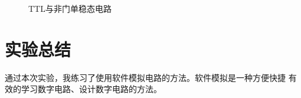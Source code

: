 \documentclass[a4paper,twoside]{ctexart}
\begin{document}
\begin{spacing}{1.2}
\begin{figure}[htbp]
	\centering
	\caption{TTL与非门单稳态电路}
	\label{fig:555}
\end{figure}

\section{实验总结}

通过本次实验，我练习了使用软件模拟电路的方法。软件模拟是一种方便快捷
有效的学习数字电路、设计数字电路的方法。

\end{spacing}
\end{document}
